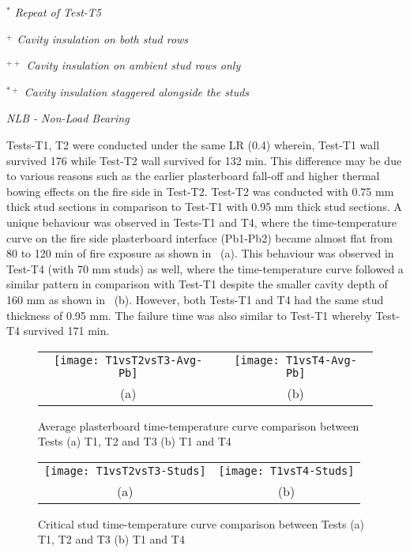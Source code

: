 \begin{sidewaystable}[!htbp]
\begin{threeparttable}
\begin{center}
\begin{tablenotes}
						\small
						\item \textit{\(^*\) Repeat of Test-T5}
						\item \textit{\(^+\) Cavity insulation on both stud rows}
						\item \textit{\(^{++}\) Cavity insulation on ambient stud rows only}
						\item \textit{\(^{*+}\) Cavity insulation staggered alongside the studs}
						\item \textit{NLB - Non-Load Bearing}
					\end{tablenotes}
		\end{center}
	\end{threeparttable}
\end{sidewaystable}%

Tests-T1, T2 were conducted under the same LR (0.4) wherein, Test-T1 wall survived 176 while Test-T2 wall survived for 132 min. This difference may be due to various reasons such as the earlier plasterboard fall-off and higher thermal bowing effects on the fire side in Test-T2. Test-T2 was conducted with 0.75 mm thick stud sections in comparison to Test-T1 with 0.95 mm thick stud sections. A unique behaviour was observed in Tests-T1 and T4, where the time-temperature curve on the fire side plasterboard interface (Pb1-Pb2) became almost flat from 80 to 120 min of fire exposure as shown in ~(a). This behaviour was observed in Test-T4 (with 70 mm studs) as well, where the time-temperature curve followed a similar pattern in comparison with Test-T1 despite the smaller cavity depth of 160 mm as shown in ~(b). However, both Tests-T1 and T4 had the same stud thickness of 0.95 mm. The failure time was also similar to Test-T1 whereby Test-T4 survived 171 min. 
\begin{figure}[!htbp]
	\centering
		\begin{tabular}{cc}
			\texttt{[image: T1vsT2vsT3-Avg-Pb]} & \texttt{[image: T1vsT4-Avg-Pb]} \\ 
			(a) & (b) \\ 
		\end{tabular} 
		\caption{Average plasterboard time-temperature curve comparison between Tests (a) T1, T2 and T3 (b) T1 and T4}
		\label{fig:T1vsT2vsT3vsT4-Avg-Pb}
\end{figure}
\begin{figure}[!htbp]
	\centering
		\begin{tabular}{cc}
			\texttt{[image: T1vsT2vsT3-Studs]} & \texttt{[image: T1vsT4-Studs]} \\ 
			(a) & (b) \\ 
		\end{tabular} 
		\caption{Critical stud time-temperature curve comparison between Tests (a) T1, T2 and T3 (b) T1 and T4}
		\label{fig:T1vsT2vsT3vsT4-Studs}
\end{figure}

